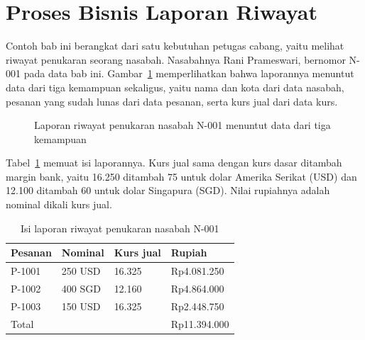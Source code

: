 \section{Proses Bisnis Laporan Riwayat}

Contoh bab ini berangkat dari satu kebutuhan petugas cabang, yaitu melihat
riwayat penukaran seorang nasabah. Nasabahnya Rani Prameswari, bernomor N-001
pada data bab ini. Gambar~\ref{fig:proses-mikroservis} memperlihatkan bahwa
laporannya menuntut data dari tiga kemampuan sekaligus, yaitu nama dan kota
dari data nasabah, pesanan yang sudah lunas dari data pesanan, serta kurs jual
dari data kurs.

\begin{figure}[htbp]
  \centering
  \caption{Laporan riwayat penukaran nasabah N-001 menuntut data dari tiga
    kemampuan}
  \label{fig:proses-mikroservis}
\end{figure}

Tabel~\ref{tab:laporan-n001} memuat isi laporannya. Kurs jual sama dengan kurs
dasar ditambah margin bank, yaitu 16.250 ditambah 75 untuk dolar Amerika
Serikat (USD) dan 12.100 ditambah 60 untuk dolar Singapura (SGD). Nilai
rupiahnya adalah nominal dikali kurs jual.

\begin{table}[htbp]
  \centering
  \caption{Isi laporan riwayat penukaran nasabah N-001}
  \label{tab:laporan-n001}
  \begin{tabularx}{\textwidth}{|l|l|l|X|}
    \hline
    \textbf{Pesanan} & \textbf{Nominal} & \textbf{Kurs jual} & \textbf{Rupiah} \\
    \hline
    P-1001 & 250 USD & 16.325 & Rp4.081.250 \\
    \hline
    P-1002 & 400 SGD & 12.160 & Rp4.864.000 \\
    \hline
    P-1003 & 150 USD & 16.325 & Rp2.448.750 \\
    \hline
    Total & & & Rp11.394.000 \\
    \hline
  \end{tabularx}
\end{table}

